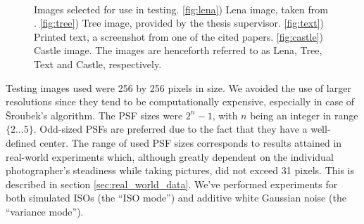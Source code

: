 \documentclass[12pt,notitlepage]{report}
\begin{document}
\begin{figure}[htb]
  \centering
	  ~
	  ~
	  ~
  \caption[Images selected for use in testing]{Images selected for use in testing. \ref{fig:lena}) Lena image, taken from  \cite{uscimgdb}. \ref{fig:tree}) Tree image, provided by the thesis supervisor. \ref{fig:text}) Printed text, a screenshot from one of the cited papers. \ref{fig:castle}) Castle image. The images are henceforth referred to as Lena, Tree, Text and Castle, respectively.}
  \label{fig:used_images}
\end{figure}



Testing images used were 256 by 256 pixels in size. We avoided the use of larger resolutions since they tend to be computationally expensive, especially in case of Šroubek's algorithm. The PSF sizes were $2^n - 1$, with $n$ being an integer in range $\lbrace 2 \dots 5 \rbrace$. Odd-sized PSFs are preferred due to the fact that they have a well-defined center. The range of used PSF sizes corresponds to results attained in real-world experiments which, although greatly dependent on the individual photographer's steadiness while taking pictures,  did not exceed 31 pixels. This is described in section \ref{sec:real_world_data}. We've performed experiments for both simulated ISOs (the ``ISO mode'') and additive white Gaussian noise  (the ``variance mode'').
\end{document}
